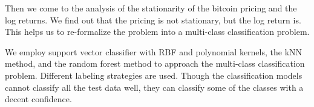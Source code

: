 \documentclass[9pt,twocolumn,twoside]{ilcss}
\begin{document}
Then we come to the analysis of the stationarity of the bitcoin pricing and the log returns. We find out that the pricing is not stationary, but the log return is. This helps us to re-formalize the problem into a multi-class classification problem. 

We employ support vector classifier with RBF and polynomial kernels, the kNN method, and the random forest method to approach the multi-class classification problem. Different labeling strategies are used. Though the classification models cannot classify all the test data well, they can classify some of the classes with a decent confidence.



\end{document}
